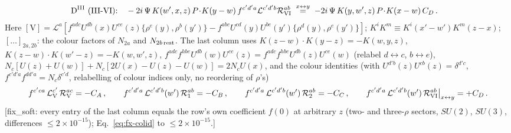 \documentclass[9pt]{article}
\numberwithin{equation}{section}
\begin{document}
{\begin{align}
\text{D}^{\rm III}\ &\text{(III-VI):}\quad-2i\,\Psi\,K(w',x,z)\,P\!\cdot\!K(y-w)\,f^{c'd'a}\mathcal{L}^{c'd'b}\mathcal{R}_{\rm VI}^{ab}\;\overset{x\leftrightarrow y}{=}\;-2i\,\Psi\,K(y,w',z)\,P\!\cdot\!K(x-w)\,C_{D}\,.\notag
\end{align}
Here $[\text{V}]=\mathcal{L}^{a}[f^{adc}U^{db}(x)U^{ce}(z)\{\rho^{e}(y),\rho^{b}(y')\}-f^{abc}U^{cd}(y)U^{be}(y')\{\rho^{d}(y),\rho^{e}(y')\}]$; $K^{i}K^{m}\equiv K^{i}(x'-w')K^{m}(z-x)$; $[\dots]_{2a,2b}$: the colour factors of $N_{2a}$ and $N_{2b\,\rm rest}$. The last column uses $K(z-w)\cdot K(y-z)=-K(w,y,z)$, $K(z-w)\cdot K(w'-z)=-K(w,w',z)$, $f^{adc}f^{hbe}U^{db}(w)U^{ce}(z)=f^{adc}f^{hbe}U^{db}(z)U^{ce}(w)$ (relabel $d\leftrightarrow c$, $b\leftrightarrow e$), $N_{c}[U(z)+U(w)]+N_{c}[2U(x)-U(z)-U(w)]=2N_{c}U(x)$, and the colour identities (with $U^{d'b}(z)U^{cb}(z)=\delta^{d'c}$, $f^{c'd'a}f^{dd'a}=N_{c}\delta^{c'd}$, relabelling of colour indices only, no reordering of $\rho$'s)
\begin{align}
f^{c'ca}\,\mathcal{L}_{\rm V}^{c'}\,\mathcal{R}_{\rm V}^{ac}=-C_{A}\,,\qquad f^{c'd'a}\,\mathcal{L}^{c'd'b}(w')\,\mathcal{R}_{1}^{ab}=-C_{B}\,,\qquad f^{c'd'a}\,\mathcal{L}^{c'd'b}(w')\,\mathcal{R}_{2}^{ab}=-C_{C}\,,\qquad f^{c'd'a}\,\mathcal{L}^{c'd'b}(w')\,\mathcal{R}_{\rm VI}^{ab}\big|_{x\leftrightarrow y}=+C_{D}\,.\label{eq:fx-colid}
\end{align}
[fix\_soft: every entry of the last column equals the row's own coefficient $f(0)$ at arbitrary $z$ (two- and three-$\rho$ sectors, $SU(2)$, $SU(3)$, differences $\le2\times10^{-15}$); Eq.~\eqref{eq:fx-colid} to $\le2\times10^{-15}$.]

}
\end{document}

